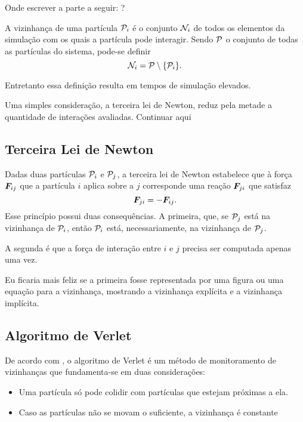 \alert{Onde escrever a parte a seguir: ?}

A vizinhança de uma partícula \({\mathcal{P}}_{i}\) é o conjunto \({\mathcal{N}}_{i}\) de todos os elementos da simulação com os quais a partícula pode interagir. Sendo \(\mathcal{P}\) o conjunto de todas as partículas do sistema, pode-se definir
\begin{equation*}
	\neighborhoodi = \particleSet \setminus \Bqty{\particlei}.
\end{equation*}

Entretanto essa definição resulta em tempos de simulação elevados.

Uma simples consideração, a terceira lei de Newton, reduz pela metade a quantidade de interações avaliadas. \alert{Continuar aqui}

\subsection{Terceira Lei de Newton}

Dadas duas partículas \({\mathcal{P}}_{i}\) e \({\mathcal{P}}_{j}\), a terceira lei de Newton estabelece que à força \({\bm{F}}_{i j}\) que a partícula \(i\) aplica sobre a \(j\) corresponde uma reação \({\bm{F}}_{j i}\) que satisfaz
\begin{equation*}
	{\bm{F}}_{j i} = -{\bm{F}}_{i j}.
\end{equation*}
Esse princípio possui duas consequências. A primeira, que, se \({\mathcal{P}}_{j}\) está na vizinhança de \({\mathcal{P}}_{i}\), então \({\mathcal{P}}_{i}\) está, necessariamente, na vizinhança de \({\mathcal{P}}_{j}\).

A segunda é que a força de interação entre \(i\) e \(j\) precisa ser computada apenas uma vez.

\alert{Eu ficaria mais feliz se a primeira fosse representada por uma figura ou uma equação para a vizinhança, mostrando a vizinhança explícita e a vizinhança implícita.}

\subsection{Algoritmo de Verlet}

De acordo com , o algoritmo de Verlet é um método de monitoramento de vizinhanças que fundamenta-se em duas considerações:
\begin{itemize}
	\item Uma partícula só pode colidir com partículas que estejam próximas a ela.
	\item \alert{Caso as partículas não se movam o suficiente, a vizinhança é constante}
\end{itemize}


